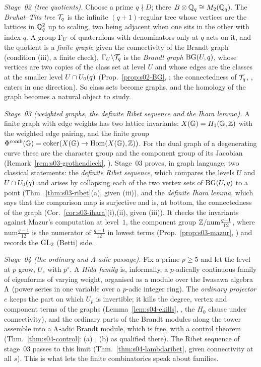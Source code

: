 \emph{Stage~02 (tree quotients).} Choose a prime $q\nmid D$; there $B\otimes\mathbb{Q}_q\cong M_2(\mathbb{Q}_q)$. The
\emph{Bruhat--Tits tree} $\mathcal{T}_q$ is the infinite $(q+1)$-regular tree whose vertices are the lattices in $\mathbb{Q}_q^2$ up to scaling,
two being adjacent when one sits in the other with index $q$. A group $\Gamma_U$ of quaternions with denominators only at $q$ acts
on it, and the quotient is a \emph{finite graph}: given the connectivity of the Brandt graph (condition (iii), a finite
check), $\Gamma_U\backslash\mathcal{T}_q$ is the \emph{Brandt graph} $\mathrm{BG}(U,q)$, whose vertices are two copies of the class set at level $U$
and whose edges are the classes at the smaller level $U\cap U_0(q)$ (Prop.~\ref{prop:s02-BG}, \stproved; the connectedness of
$\mathcal{T}_q$, \stcited, enters in one direction). So class sets become graphs, and the homology of the graph becomes a natural
object to study.

\emph{Stage~03 (weighted graphs, the definite Ribet sequence and the Ihara lemma).} A finite graph with
edge weights has two lattice invariants: $X(\mathbb{G})=H_1(\mathbb{G},\mathbb{Z})$ with the weighted edge pairing, and the finite group
$\Phi^{\mathrm{comb}}(\mathbb{G})=\operatorname{coker}(X(\mathbb{G})\to\operatorname{Hom}(X(\mathbb{G}),\mathbb{Z}))$. For the dual graph of a degenerating curve these are the character group and the
component group of its Jacobian (Remark~\ref{rem:s03-grothendieck}, \stcited). Stage~03 proves, in graph language, two classical
statements: the \emph{definite Ribet sequence}, which compares the levels $U$ and $U\cap U_0(q)$ and arises by collapsing each
of the two vertex sets of $\mathrm{BG}(U,q)$ to a point (Thm.~\ref{thm:s03-ribet}(a), \stproved{} given (iii)), and the \emph{definite
Ihara lemma}, which says that the comparison map is surjective and is, at bottom, the connectedness of the graph
(Cor.~\ref{cor:s03-ihara}(i),(ii), \stproved{} given (iii)). It checks the invariants against Mazur's computation at level~$1$, the component group
$\mathbb{Z}/\mathrm{num}\frac{q-1}{12}$, where $\mathrm{num}\frac{q-1}{12}$ is the numerator of $\frac{q-1}{12}$ in lowest terms (Prop.~\ref{prop:s03-mazur}, \stpmc) and records the $\mathrm{GL}_2$ (Betti) side.

\emph{Stage~04 (the ordinary and $\Lambda$-adic passage).} Fix a prime $p\ge5$ and let the level at $p$
grow, $U_s$ with $p^s$. A \emph{Hida family} is, informally, a $p$-adically continuous family of eigenforms of varying weight,
organised as a module over the Iwasawa algebra $\Lambda$ (power series in one variable over a $p$-adic integer ring). The
\emph{ordinary projector} $e$ keeps the part on which $U_p$ is invertible; it kills the degree, vertex and component terms of the
graphs (Lemma~\ref{lem:s04-ekills}, \stproved, the $H_0$ clause under connectivity), and the ordinary parts of the Brandt modules along the tower assemble into a
$\Lambda$-adic Brandt module, which is free, with a control theorem (Thm.~\ref{thm:s04-control}: (a) \stproved, (b) as qualified
there). The Ribet sequence of stage~03 passes to this limit (Thm.~\ref{thm:s04-lambdaribet}, \stproved{} given connectivity at all
$s$). This is what lets the finite combinatorics speak about families.


